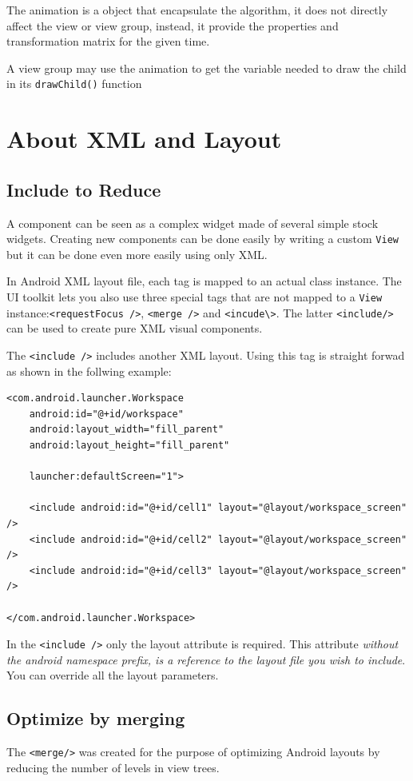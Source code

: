\documentclass[11pt, a4paper]{book}
\begin{document}
The animation is a object that encapsulate the algorithm, it does not directly
affect the view or view group, instead, it provide the properties and
transformation matrix for the given time.

A view group may use the animation to get the variable needed to draw the child
in its \verb|drawChild()| function

\chapter{About XML and Layout}
\section{Include to Reduce}
A component can be seen as a complex widget made of several simple stock
widgets. Creating new components can be done easily by writing a custom
\verb|View| but it can be done even more easily using only XML.

In Android XML layout file, each tag is mapped to an actual class instance. The
UI toolkit lets you also use three special tags that are not mapped to a 
\verb|View| instance:\verb|<requestFocus />|, \verb|<merge />| and
\verb|<incude\>|. The latter \verb|<include/>| can be used to create pure XML
visual components.

The \verb|<include />| includes another XML layout. Using this tag is straight
forwad as shown in the follwing example:
\begin{verbatim}
<com.android.launcher.Workspace
    android:id="@+id/workspace"
    android:layout_width="fill_parent"
    android:layout_height="fill_parent"

    launcher:defaultScreen="1">

    <include android:id="@+id/cell1" layout="@layout/workspace_screen" />
    <include android:id="@+id/cell2" layout="@layout/workspace_screen" />
    <include android:id="@+id/cell3" layout="@layout/workspace_screen" />

</com.android.launcher.Workspace>
\end{verbatim}

In the \verb|<include />| only the layout attribute is required. This attribute
\emph{without the android namespace prefix, is a reference to the layout file
you wish to include}. You can override all the layout parameters.



\section{Optimize by merging}
The \verb|<merge/>| was created for the purpose of optimizing Android layouts by
reducing the number of levels in view trees. 
\end{document}

